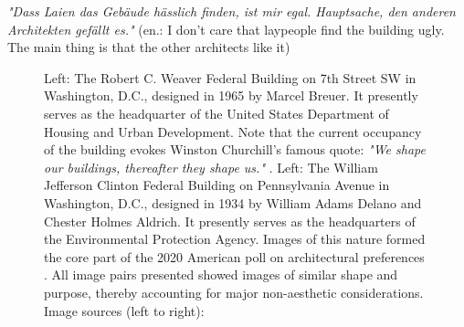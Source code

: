 \documentclass{article}
\begin{document}
\textit{"Dass Laien das Gebäude hässlich finden, ist mir egal. Hauptsache, den anderen Architekten gefällt es."} (en.: I don't care that laypeople find the building ugly. The main thing is that the other architects like it) 



\begin{figure}[ht!]
    \centering
    \caption{Left: The Robert C. Weaver Federal Building on 7th Street SW in Washington, D.C., designed in 1965 by Marcel Breuer. It presently serves as the headquarter of the United States Department of Housing and Urban Development. Note that the current occupancy of the building evokes Winston Churchill's famous quote: \textit{"We shape our buildings, thereafter they shape us."} \cite{noauthor_churchill_nodate} . Left: The William Jefferson Clinton Federal Building on Pennsylvania Avenue in Washington, D.C., designed in 1934 by William Adams Delano and Chester Holmes Aldrich. It presently serves as the headquarters of the Environmental Protection Agency. Images of this nature formed the core part of the 2020 American poll on architectural preferences \cite{noauthor_americans_2020}. All image pairs presented showed images of similar shape and purpose, thereby accounting for major non-aesthetic considerations. \newline Image sources (left to right): \cite{highsmith_robert_2012}\cite{wikimedia_commons_user_moreau1_epa_2018}}
    \label{fig:federal_buildings}
\end{figure}
\end{document}
